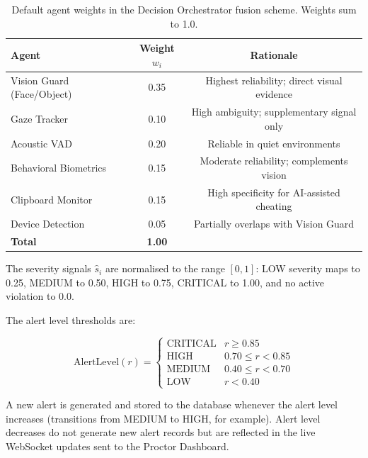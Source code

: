 \begin{table}[h]
    \centering
    \caption{Default agent weights in the Decision Orchestrator fusion scheme. Weights sum to 1.0.}
    \begin{tabular}{@{}lcc@{}}
        \toprule
        Agent & Weight $w_i$ & Rationale \\
        \midrule
        Vision Guard (Face/Object)   & 0.35 & Highest reliability; direct visual evidence \\
        Gaze Tracker                 & 0.10 & High ambiguity; supplementary signal only \\
        Acoustic VAD                 & 0.20 & Reliable in quiet environments \\
        Behavioral Biometrics        & 0.15 & Moderate reliability; complements vision \\
        Clipboard Monitor            & 0.15 & High specificity for AI-assisted cheating \\
        Device Detection             & 0.05 & Partially overlaps with Vision Guard \\
        \midrule
        \textbf{Total}              & \textbf{1.00} & \\
        \bottomrule
    \end{tabular}
    \label{tab:weights}
\end{table}

The severity signals $\hat{s}_i$ are normalised to the range $[0,1]$: LOW severity maps to 0.25, MEDIUM to 0.50, HIGH to 0.75, CRITICAL to 1.00, and no active violation to 0.0.

The alert level thresholds are:

\begin{equation}
    \text{AlertLevel}(r) =
    \begin{cases}
        \text{CRITICAL} & r \geq 0.85 \\
        \text{HIGH}     & 0.70 \leq r < 0.85 \\
        \text{MEDIUM}   & 0.40 \leq r < 0.70 \\
        \text{LOW}      & r < 0.40
    \end{cases}
    \label{eq:tiers}
\end{equation}

A new alert is generated and stored to the database whenever the alert level increases (transitions from MEDIUM to HIGH, for example). Alert level decreases do not generate new alert records but are reflected in the live WebSocket updates sent to the Proctor Dashboard.

